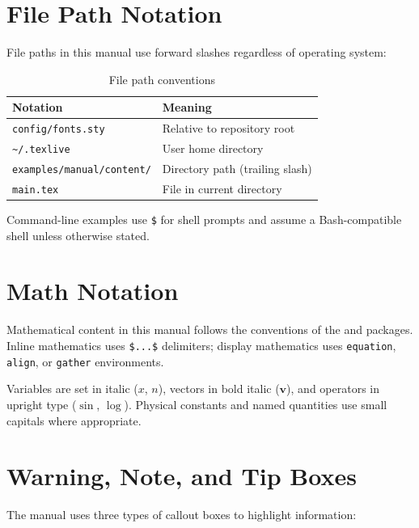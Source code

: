 \section{File Path Notation}

File paths in this manual use forward slashes regardless of operating system:

\begin{table}[htbp]
    \centering
    \caption{File path conventions}
    \label{tab:path-notation}
    \begin{tabular}{@{}ll@{}}
        \toprule
        \textbf{Notation} & \textbf{Meaning} \\
        \midrule
        \texttt{config/fonts.sty}          & Relative to repository root \\
        \texttt{\textasciitilde/.texlive}  & User home directory \\
        \texttt{examples/manual/content/}  & Directory path (trailing slash) \\
        \texttt{main.tex}                  & File in current directory \\
        \bottomrule
    \end{tabular}
\end{table}

Command-line examples use \texttt{\$} for shell prompts and assume a
Bash-compatible shell unless otherwise stated.

\section{Math Notation}

Mathematical content in this manual follows the conventions of the
 and  packages.  Inline
mathematics uses \verb|$...$| delimiters; display mathematics uses
\texttt{equation}, \texttt{align}, or \texttt{gather} environments.

Variables are set in italic (\(x\), \(n\)), vectors in bold italic
(\(\mathbf{v}\)), and operators in upright type
(\(\sin\), \(\log\)).  Physical constants and named quantities use
small capitals where appropriate.

\section{Warning, Note, and Tip Boxes}

The manual uses three types of callout boxes to highlight information:

